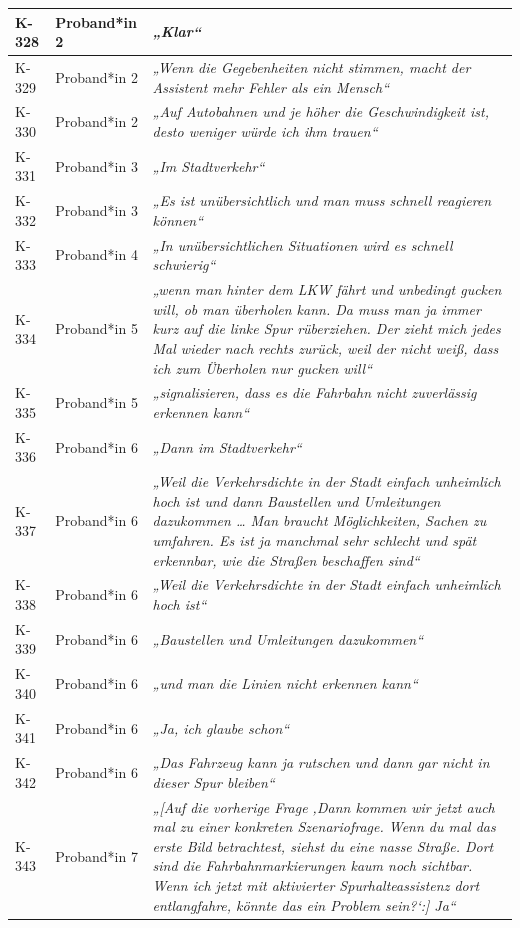{\begin{xltabular}{\textwidth}{
    |P{0.10\textwidth}
    |P{0.17\textwidth}
    |Y|
}
K-328 & Proband*in 2 & \textit{„Klar“} \\
\hline
K-329 & Proband*in 2 & \textit{„Wenn die Gegebenheiten nicht stimmen, macht der Assistent mehr Fehler als ein Mensch“} \\
\hline
K-330 & Proband*in 2 & \textit{„Auf Autobahnen und je höher die Geschwindigkeit ist, desto weniger würde ich ihm trauen“} \\
\hline
K-331 & Proband*in 3 & \textit{„Im Stadtverkehr“} \\
\hline
K-332 & Proband*in 3 & \textit{„Es ist unübersichtlich und man muss schnell reagieren können“} \\
\hline
K-333 & Proband*in 4 & \textit{„In unübersichtlichen Situationen wird es schnell schwierig“} \\
\hline
K-334 & Proband*in 5 & \textit{„wenn man hinter dem LKW fährt und unbedingt gucken will, ob man überholen kann. Da muss man ja immer kurz auf die linke Spur rüberziehen. Der zieht mich jedes Mal wieder nach rechts zurück, weil der nicht weiß, dass ich zum Überholen nur gucken will“} \\
\hline
K-335 & Proband*in 5 & \textit{„signalisieren, dass es die Fahrbahn nicht zuverlässig erkennen kann“} \\
\hline
K-336 & Proband*in 6 & \textit{„Dann im Stadtverkehr“} \\
\hline
K-337 & Proband*in 6 & \textit{„Weil die Verkehrsdichte in der Stadt einfach unheimlich hoch ist und dann Baustellen und Umleitungen dazukommen … Man braucht Möglichkeiten, Sachen zu umfahren. Es ist ja manchmal sehr schlecht und spät erkennbar, wie die Straßen beschaffen sind“} \\
\hline
K-338 & Proband*in 6 & \textit{„Weil die Verkehrsdichte in der Stadt einfach unheimlich hoch ist“} \\
\hline
K-339 & Proband*in 6 & \textit{„Baustellen und Umleitungen dazukommen“} \\
\hline
K-340 & Proband*in 6 & \textit{„und man die Linien nicht erkennen kann“} \\
\hline
K-341 & Proband*in 6 & \textit{„Ja, ich glaube schon“} \\
\hline
K-342 & Proband*in 6 & \textit{„Das Fahrzeug kann ja rutschen und dann gar nicht in dieser Spur bleiben“} \\
\hline
K-343 & Proband*in 7 & \textit{„[Auf die vorherige Frage ‚Dann kommen wir jetzt auch mal zu einer konkreten Szenariofrage. Wenn du mal das erste Bild betrachtest, siehst du eine nasse Straße. Dort sind die Fahrbahnmarkierungen kaum noch sichtbar. Wenn ich jetzt mit aktivierter Spurhalteassistenz dort entlangfahre, könnte das ein Problem sein?‘:] Ja“} \\

\end{xltabular}}
